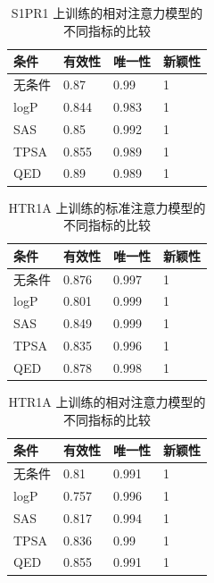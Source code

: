 \begin{translation}
\begin{table}[H]
  \centering
  \caption{S1PR1 上训练的相对注意力模型的不同指标的比较}
  \label{tab:6}
  \begin{tabular}{llll}
    \hline 条件  & 有效性   & 唯一性   & 新颖性 \\
    \hline 无条件 & 0.87  & 0.99  & 1   \\
    logP       & 0.844 & 0.983 & 1   \\
    SAS        & 0.85  & 0.992 & 1   \\
    TPSA       & 0.855 & 0.989 & 1   \\
    QED        & 0.89  & 0.989 & 1   \\
    \hline
  \end{tabular}
\end{table}

\begin{table}[H]
  \centering
  \caption{HTR1A 上训练的标准注意力模型的不同指标的比较}
  \label{tab:7}
  \begin{tabular}{llll}
    \hline 条件  & 有效性   & 唯一性   & 新颖性 \\
    \hline 无条件 & 0.876 & 0.997 & 1   \\
    logP       & 0.801 & 0.999 & 1   \\
    SAS        & 0.849 & 0.999 & 1   \\
    TPSA       & 0.835 & 0.996 & 1   \\
    QED        & 0.878 & 0.998 & 1   \\
    \hline
  \end{tabular}
\end{table}

\begin{table}[H]
  \centering
  \caption{HTR1A 上训练的相对注意力模型的不同指标的比较}
  \label{tab:8}
  \begin{tabular}{llll}
    \hline 条件  & 有效性   & 唯一性   & 新颖性 \\
    \hline 无条件 & 0.81  & 0.991 & 1   \\
    logP       & 0.757 & 0.996 & 1   \\
    SAS        & 0.817 & 0.994 & 1   \\
    TPSA       & 0.836 & 0.99  & 1   \\
    QED        & 0.855 & 0.991 & 1   \\
    \hline
  \end{tabular}
\end{table}


\end{translation}
